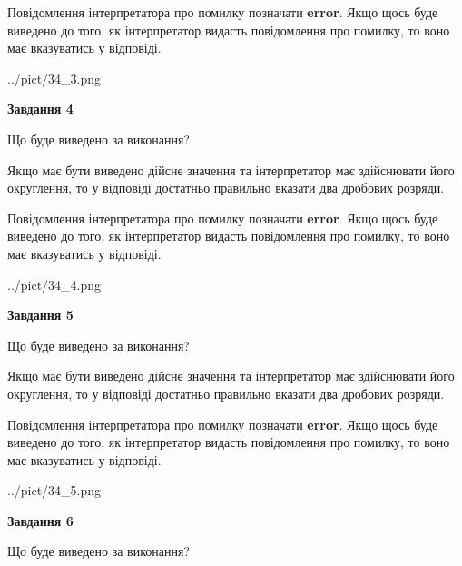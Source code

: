 \documentclass[12pt, ukrainian]{article}
\begin{document}
{\begin {Large}
Повідомлення інтерпретатора про помилку позначати \textbf{error}.
Якщо щось буде виведено до того, як інтерпретатор видасть повідомлення про помилку, 
то воно має вказуватись у відповіді. \par

\begin{center}
	{../pict/34_3.png}
\end{center}
\newpage

{\begin {center}\textbf{Завдання 4}\end {center}}\par
Що буде виведено за виконання? \par

Якщо має бути виведено дійсне значення та інтерпретатор має здійснювати його округлення, 
то у відповіді достатньо правильно вказати два дробових розряди.

Повідомлення інтерпретатора про помилку позначати \textbf{error}.
Якщо щось буде виведено до того, як інтерпретатор видасть повідомлення про помилку, 
то воно має вказуватись у відповіді. \par

\begin{center}
	{../pict/34_4.png}
\end{center}
\newpage

{\begin {center}\textbf{Завдання 5}\end {center}}\par
Що буде виведено за виконання? \par

Якщо має бути виведено дійсне значення та інтерпретатор має здійснювати його округлення, 
то у відповіді достатньо правильно вказати два дробових розряди.

Повідомлення інтерпретатора про помилку позначати \textbf{error}.
Якщо щось буде виведено до того, як інтерпретатор видасть повідомлення про помилку, 
то воно має вказуватись у відповіді. \par

\begin{center}
	{../pict/34_5.png}
\end{center}
\newpage

{\begin {center}\textbf{Завдання 6}\end {center}}\par
Що буде виведено за виконання? \par


\end{Large}}
\end{document}

